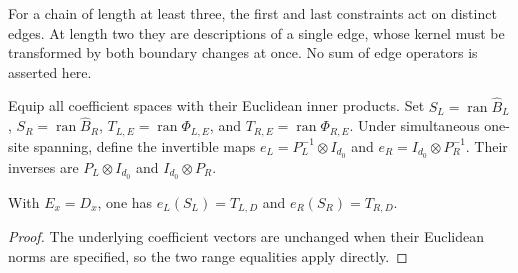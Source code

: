 For a chain of length at least three, the first and last constraints
act on distinct edges. At length two they are descriptions of a single
edge, whose kernel must be transformed by both boundary changes at once.
No sum of edge operators is asserted here.

\begin{definition}
    \label{def:mpo_joint_edge_normalization_equiv}
    \leanok
    Equip all coefficient spaces with their Euclidean inner products.
    Set $S_L=\operatorname{ran}\widehat B_L$,
    $S_R=\operatorname{ran}\widehat B_R$,
    $T_{L,E}=\operatorname{ran}\Phi_{L,E}$, and
    $T_{R,E}=\operatorname{ran}\Phi_{R,E}$.
    Under simultaneous one-site spanning, define the invertible maps
    $e_L=P_L^{-1}\otimes I_{d_0}$ and
    $e_R=I_{d_0}\otimes P_R^{-1}$. Their inverses are
    $P_L\otimes I_{d_0}$ and $I_{d_0}\otimes P_R$.
\end{definition}

\begin{lemma}
    \label{thm:mpo_joint_edge_euclidean_support}
    \leanok
    With $E_x=D_x$, one has $e_L(S_L)=T_{L,D}$ and $e_R(S_R)=T_{R,D}$.
\end{lemma}
\begin{proof}
    \leanok
    The underlying coefficient vectors are unchanged when their
    Euclidean norms are specified, so the two range equalities apply directly.
\end{proof}

